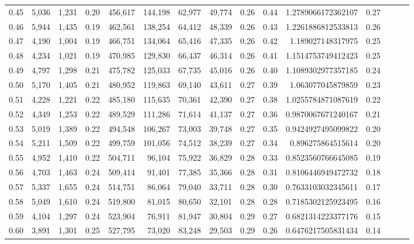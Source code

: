 \begin{tabular}{rrrrrrrrrrrrrrr}
0.45 &   5,036 &  1,231 &  0.20 &  456,617 &  144,198 &   62,977 &   49,774 &  0.26 &  0.44 &    1.2789066172362107 &      0.27 \\
0.46 &   5,944 &  1,435 &  0.19 &  462,561 &  138,254 &   64,412 &   48,339 &  0.26 &  0.43 &    1.2261886812533813 &      0.26 \\
0.47 &   4,190 &  1,004 &  0.19 &  466,751 &  134,064 &   65,416 &   47,335 &  0.26 &  0.42 &     1.189027148317975 &      0.25 \\
0.48 &   4,234 &  1,021 &  0.19 &  470,985 &  129,830 &   66,437 &   46,314 &  0.26 &  0.41 &    1.1514753749412423 &      0.25 \\
0.49 &   4,797 &  1,298 &  0.21 &  475,782 &  125,033 &   67,735 &   45,016 &  0.26 &  0.40 &    1.1089302977357185 &      0.24 \\
0.50 &   5,170 &  1,405 &  0.21 &  480,952 &  119,863 &   69,140 &   43,611 &  0.27 &  0.39 &     1.063077045879859 &      0.23 \\
0.51 &   4,228 &  1,221 &  0.22 &  485,180 &  115,635 &   70,361 &   42,390 &  0.27 &  0.38 &    1.0255784871087619 &      0.22 \\
0.52 &   4,349 &  1,253 &  0.22 &  489,529 &  111,286 &   71,614 &   41,137 &  0.27 &  0.36 &    0.9870067671240167 &      0.21 \\
0.53 &   5,019 &  1,389 &  0.22 &  494,548 &  106,267 &   73,003 &   39,748 &  0.27 &  0.35 &    0.9424927495099822 &      0.20 \\
0.54 &   5,211 &  1,509 &  0.22 &  499,759 &  101,056 &   74,512 &   38,239 &  0.27 &  0.34 &     0.896275864515614 &      0.20 \\
0.55 &   4,952 &  1,410 &  0.22 &  504,711 &   96,104 &   75,922 &   36,829 &  0.28 &  0.33 &    0.8523560766645085 &      0.19 \\
0.56 &   4,703 &  1,463 &  0.24 &  509,414 &   91,401 &   77,385 &   35,366 &  0.28 &  0.31 &    0.8106446949472732 &      0.18 \\
0.57 &   5,337 &  1,655 &  0.24 &  514,751 &   86,064 &   79,040 &   33,711 &  0.28 &  0.30 &    0.7633103032345611 &      0.17 \\
0.58 &   5,049 &  1,610 &  0.24 &  519,800 &   81,015 &   80,650 &   32,101 &  0.28 &  0.28 &    0.7185302125923495 &      0.16 \\
0.59 &   4,104 &  1,297 &  0.24 &  523,904 &   76,911 &   81,947 &   30,804 &  0.29 &  0.27 &    0.6821314223377176 &      0.15 \\
0.60 &   3,891 &  1,301 &  0.25 &  527,795 &   73,020 &   83,248 &   29,503 &  0.29 &  0.26 &    0.6476217505831434 &      0.14 \\

\end{tabular}
